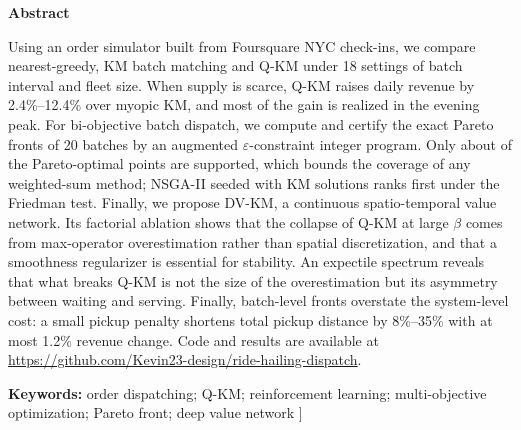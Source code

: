 \begin{minipage}{\textwidth}
	\centering
	{\noindent \textbf{\large Abstract}}
	\vspace{0.5em}
\end{minipage}
\begin{minipage}{1\textwidth}
	\setlength{\parindent}{2em}
	\indent Using an order simulator built from Foursquare NYC check-ins, we compare nearest-greedy, KM batch matching and Q-KM under 18 settings of batch interval and fleet size. When supply is scarce, Q-KM raises daily revenue by 2.4\%--12.4\% over myopic KM, and most of the gain is realized in the evening peak. For bi-objective batch dispatch, we compute and certify the exact Pareto fronts of 20 batches by an augmented $\varepsilon$-constraint integer program. Only about \supfrac{} of the Pareto-optimal points are supported, which bounds the coverage of any weighted-sum method; NSGA-II seeded with KM solutions ranks first under the Friedman test. Finally, we propose DV-KM, a continuous spatio-temporal value network. Its factorial ablation shows that the collapse of Q-KM at large $\beta$ comes from max-operator overestimation rather than spatial discretization, and that a smoothness regularizer is essential for stability. An expectile spectrum reveals that what breaks Q-KM is not the size of the overestimation but its asymmetry between waiting and serving. \HINDSIGHTABSEN{} Finally, batch-level fronts overstate the system-level cost: a small pickup penalty shortens total pickup distance by 8\%--35\% with at most 1.2\% revenue change. Code and results are available at \url{https://github.com/Kevin23-design/ride-hailing-dispatch}.
\end{minipage}
\vspace{0.6em}

{\noindent \textbf{Keywords:} order dispatching; Q-KM; reinforcement learning; multi-objective optimization; Pareto front; deep value network}
\vspace{0.8em}
]
